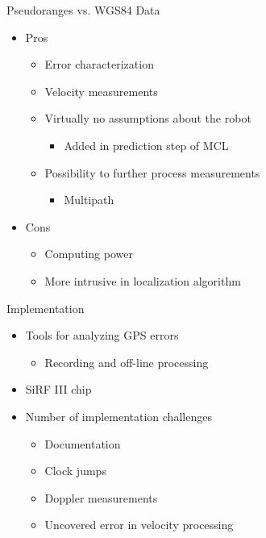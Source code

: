\documentclass[utf8,12pt]{beamer}
\begin{document}
\begin{frame}{Pseudoranges vs. WGS84 Data}
    \begin{itemize}
        \item Pros
        \begin{itemize}
            \item Error characterization
            \item Velocity measurements
            \item Virtually no assumptions about the robot
            \begin{itemize}
                \item Added in prediction step of MCL
            \end{itemize}
            \item Possibility to further process measurements
            \begin{itemize}
                \item Multipath
            \end{itemize}
        \end{itemize}
        \item Cons
        \begin{itemize}
            \item Computing power
            \item More intrusive in localization algorithm
        \end{itemize}
    \end{itemize}
\end{frame}

{
\begin{frame}{Implementation}
    \begin{itemize}
        \item Tools for analyzing GPS errors
        \begin{itemize}
            \item Recording and off-line processing
        \end{itemize}
        \item SiRF III chip
        \item Number of implementation challenges
        \begin{itemize}
            \item Documentation
            \item Clock jumps
            \item Doppler measurements
            \item Uncovered error in velocity processing
        \end{itemize}
    \end{itemize}
\end{frame}
}
\end{document}
